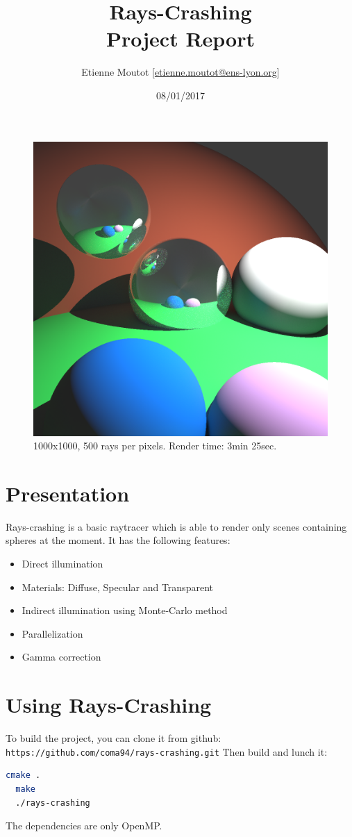 \documentclass[11pt]{article}
\title{\vspace{-8ex}
\huge Rays-Crashing\\
{\normalsize Project Report}}
\author{Etienne Moutot [\href{mailto:etienne.moutot@ens-lyon.org}{etienne.moutot@ens-lyon.org}]}
\date{08/01/2017}
\begin{document}
\maketitle

\begin{figure}[h]
\centering
\includegraphics[width=14cm]{img/ex_1000.png}
\caption{1000x1000, 500 rays per pixels. Render time: 3min 25sec.}
\end{figure}

\section{Presentation}
Rays-crashing is a basic raytracer which is able to render only scenes containing spheres at the moment. It has the following features:
\begin{itemize}
  \item Direct illumination
  \item Materials: Diffuse, Specular and Transparent
  \item Indirect illumination using Monte-Carlo method
  \item Parallelization
  \item Gamma correction
\end{itemize}

\section{Using Rays-Crashing}
To build the project, you can clone it from github: \texttt{https://github.com/coma94/rays-crashing.git}
Then build and lunch it:
\begin{lstlisting}[language=bash]
  cmake .
  make
  ./rays-crashing
\end{lstlisting}
The dependencies are only OpenMP.
\end{document}
